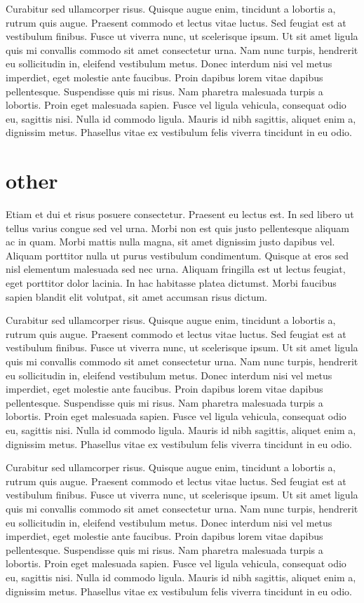 \documentclass[12pt,letterpaper,oneside]{book}
\begin{document}
Curabitur sed ullamcorper risus. Quisque augue enim, tincidunt a lobortis a, rutrum quis augue. Praesent commodo et lectus vitae luctus. Sed feugiat est at vestibulum finibus. Fusce ut viverra nunc, ut scelerisque ipsum. Ut sit amet ligula quis mi convallis commodo sit amet consectetur urna. Nam nunc turpis, hendrerit eu sollicitudin in, eleifend vestibulum metus. Donec interdum nisi vel metus imperdiet, eget molestie ante faucibus. Proin dapibus lorem vitae dapibus pellentesque. Suspendisse quis mi risus. Nam pharetra malesuada turpis a lobortis. Proin eget malesuada sapien. Fusce vel ligula vehicula, consequat odio eu, sagittis nisi. Nulla id commodo ligula. Mauris id nibh sagittis, aliquet enim a, dignissim metus. Phasellus vitae ex vestibulum felis viverra tincidunt in eu odio. 

\section{other}
 Etiam et dui et risus posuere consectetur. Praesent eu lectus est. In sed libero ut tellus varius congue sed vel urna. Morbi non est quis justo pellentesque aliquam ac in quam. Morbi mattis nulla magna, sit amet dignissim justo dapibus vel. Aliquam porttitor nulla ut purus vestibulum condimentum. Quisque at eros sed nisl elementum malesuada sed nec urna. Aliquam fringilla est ut lectus feugiat, eget porttitor dolor lacinia. In hac habitasse platea dictumst. Morbi faucibus sapien blandit elit volutpat, sit amet accumsan risus dictum.


Curabitur sed ullamcorper risus. Quisque augue enim, tincidunt a lobortis a, rutrum quis augue. Praesent commodo et lectus vitae luctus. Sed feugiat est at vestibulum finibus. Fusce ut viverra nunc, ut scelerisque ipsum. Ut sit amet ligula quis mi convallis commodo sit amet consectetur urna. Nam nunc turpis, hendrerit eu sollicitudin in, eleifend vestibulum metus. Donec interdum nisi vel metus imperdiet, eget molestie ante faucibus. Proin dapibus lorem vitae dapibus pellentesque. Suspendisse quis mi risus. Nam pharetra malesuada turpis a lobortis. Proin eget malesuada sapien. Fusce vel ligula vehicula, consequat odio eu, sagittis nisi. Nulla id commodo ligula. Mauris id nibh sagittis, aliquet enim a, dignissim metus. Phasellus vitae ex vestibulum felis viverra tincidunt in eu odio. 

Curabitur sed ullamcorper risus. Quisque augue enim, tincidunt a lobortis a, rutrum quis augue. Praesent commodo et lectus vitae luctus. Sed feugiat est at vestibulum finibus. Fusce ut viverra nunc, ut scelerisque ipsum. Ut sit amet ligula quis mi convallis commodo sit amet consectetur urna. Nam nunc turpis, hendrerit eu sollicitudin in, eleifend vestibulum metus. Donec interdum nisi vel metus imperdiet, eget molestie ante faucibus. Proin dapibus lorem vitae dapibus pellentesque. Suspendisse quis mi risus. Nam pharetra malesuada turpis a lobortis. Proin eget malesuada sapien. Fusce vel ligula vehicula, consequat odio eu, sagittis nisi. Nulla id commodo ligula. Mauris id nibh sagittis, aliquet enim a, dignissim metus. Phasellus vitae ex vestibulum felis viverra tincidunt in eu odio. 
\end{document}
